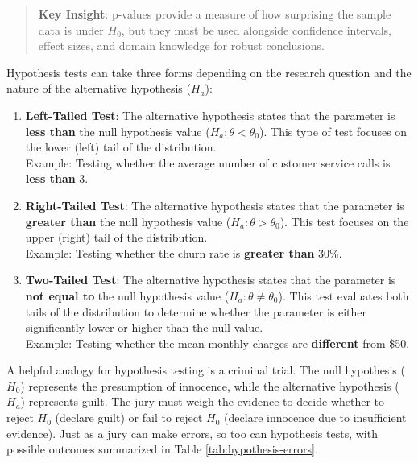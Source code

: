 \documentclass[
]{book}
\theoremstyle{definition}
\theoremstyle{definition}
\theoremstyle{definition}
\theoremstyle{definition}
\theoremstyle{remark}
\begin{document}
\begin{quote}
\textbf{Key Insight}: p-values provide a measure of how surprising the sample data is under \(H_0\), but they must be used alongside confidence intervals, effect sizes, and domain knowledge for robust conclusions.
\end{quote}

Hypothesis tests can take three forms depending on the research question and the nature of the alternative hypothesis (\(H_a\)):

\begin{enumerate}
\def\labelenumi{\arabic{enumi}.}
\item
  \textbf{Left-Tailed Test}: The alternative hypothesis states that the parameter is \textbf{less than} the null hypothesis value (\(H_a: \theta < \theta_0\)). This type of test focuses on the lower (left) tail of the distribution.\\
  Example: Testing whether the average number of customer service calls is \textbf{less than} 3.
\item
  \textbf{Right-Tailed Test}: The alternative hypothesis states that the parameter is \textbf{greater than} the null hypothesis value (\(H_a: \theta > \theta_0\)). This test focuses on the upper (right) tail of the distribution.\\
  Example: Testing whether the churn rate is \textbf{greater than} 30\%.
\item
  \textbf{Two-Tailed Test}: The alternative hypothesis states that the parameter is \textbf{not equal to} the null hypothesis value (\(H_a: \theta \neq \theta_0\)). This test evaluates both tails of the distribution to determine whether the parameter is either significantly lower or higher than the null value.\\
  Example: Testing whether the mean monthly charges are \textbf{different} from \$50.
\end{enumerate}

A helpful analogy for hypothesis testing is a criminal trial. The null hypothesis (\(H_0\)) represents the presumption of innocence, while the alternative hypothesis (\(H_a\)) represents guilt. The jury must weigh the evidence to decide whether to reject \(H_0\) (declare guilt) or fail to reject \(H_0\) (declare innocence due to insufficient evidence). Just as a jury can make errors, so too can hypothesis tests, with possible outcomes summarized in Table \ref{tab:hypothesis-errors}.
\end{document}
